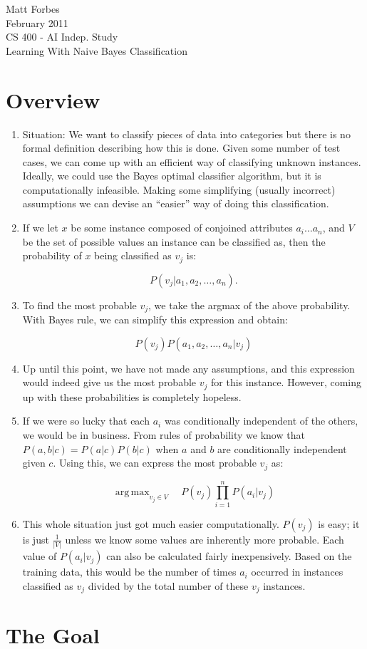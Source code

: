 \documentclass[a4paper,12pt]{article}
\DeclareMathOperator*{\argmax}{arg\,max}
\begin{document}
Matt Forbes \\
February 2011 \\
CS 400 - AI Indep. Study \\
Learning With Naive Bayes Classification

\section*{Overview}

\begin{enumerate}[]
  \item Situation: We want to classify pieces of data into categories
    but there is no formal definition describing how this is
    done. Given some number of test cases, we can come up with an
    efficient way of classifying unknown instances. Ideally, we could
    use the Bayes optimal classifier algorithm, but it is
    computationally infeasible. Making some simplifying (usually
    incorrect) assumptions we can devise an ``easier'' way of doing
    this classification.
  
  \item If we let $x$ be some instance composed of conjoined
    attributes $a_i \dots a_n$, and $V$ be the set of possible values
    an instance can be classified as, then the probability of $x$
    being classified as $v_j$ is:
    
    \[P(v_j|a_1,a_2, \dots ,a_n). \]
    
  \item To find the most probable $v_j$, we take the argmax of the
    above probability. With Bayes rule, we can simplify this
    expression and obtain:
    
    \[P(v_j)P(a_1,a_2, \dots ,a_n|v_j)\]

  \item Up until this point, we have not made any assumptions, and
    this expression would indeed give us the most probable $v_j$ for
    this instance. However, coming up with these probabilities is
    completely hopeless. 
    
  \item If we were so lucky that each $a_i$ was conditionally
    independent of the others, we would be in business. From rules of
    probability we know that $P(a,b|c) = P(a|c)P(b|c)$ when $a$ and
    $b$ are conditionally independent given $c$. Using this, we can
    express the most probable $v_j$ as:
    
    \[\argmax_{v_j \in V} \quad P(v_j)\prod_{i=1}^nP(a_i|v_j)\]

  \item This whole situation just got much easier
    computationally. $P(v_j)$ is easy; it is just $\frac{1}{|V|}$
    unless we know some values are inherently more probable. Each
    value of $P(a_i|v_j)$ can also be calculated fairly
    inexpensively. Based on the training data, this would be the
    number of times $a_i$ occurred in instances classified as $v_j$
    divided by the total number of these $v_j$ instances.
    
\end{enumerate}

\section*{The Goal}
\end{document}
